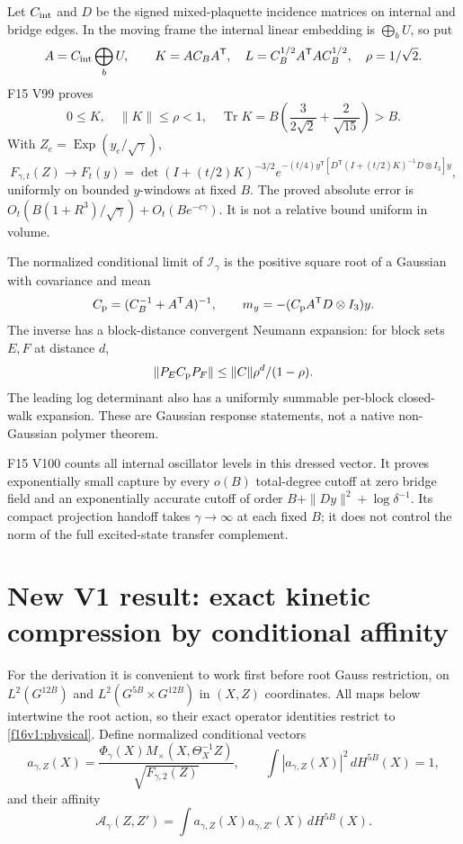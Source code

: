 \documentclass[11pt,oneside]{article}
\DeclareMathOperator{\Tr}{Tr}
\begin{document}
Let \(C_{\rm int}\) and \(D\) be the signed mixed-plaquette incidence
matrices on internal and bridge edges. In the moving frame the
internal linear embedding is \(\bigoplus_bU\), so put
\[
 A=C_{\rm int}\bigoplus_bU,\qquad
 K=AC_BA^{\mathsf T},\quad
 L=C_B^{1/2}A^{\mathsf T}AC_B^{1/2},\quad \rho=1/\sqrt2 .
\]
F15 V99 proves
\[
 0\le K,\quad\|K\|\le\rho<1,\quad
 \Tr K=B\left(\frac3{2\sqrt2}+\frac2{\sqrt{15}}\right)>B.
\]
With \(Z_e=\operatorname{Exp}(y_e/\sqrt\gamma)\),
\begin{equation}
 F_{\gamma,t}(Z)\longrightarrow
 F_t(y)=\det(I+(t/2)K)^{-3/2}
     e^{-(t/4)y^{\mathsf T}
       [D^{\mathsf T}(I+(t/2)K)^{-1}D\otimes I_3]y},
 \label{f16v1:limit}
\end{equation}
uniformly on bounded \(y\)-windows at fixed \(B\).
The proved absolute error is \(O_t(B(1+R^3)/\sqrt\gamma)
+O_t(Be^{-c\gamma})\). It is not a relative bound uniform in volume.

The normalized conditional limit of \(\mathcal I_\gamma\) is the
positive square root of a Gaussian with covariance and mean
\begin{equation}
 C_{\rm p}=(C_B^{-1}+A^{\mathsf T}A)^{-1},\qquad
 m_y=-(C_{\rm p}A^{\mathsf T}D\otimes I_3)y .
 \label{f16v1:posterior}
\end{equation}
The inverse has a block-distance convergent Neumann expansion:
for block sets \(E,F\) at distance \(d\),
\[
 \|P_EC_{\rm p}P_F\|\le\|C\|\rho^d/(1-\rho).
\]
The leading log determinant also has a uniformly summable
per-block closed-walk expansion. These are Gaussian response
statements, not a native non-Gaussian polymer theorem.

F15 V100 counts all internal oscillator levels in this dressed
vector. It proves exponentially small capture by every
\(o(B)\) total-degree cutoff at zero bridge field and an
exponentially accurate cutoff of order
\(B+\|Dy\|^2+\log\delta^{-1}\). Its compact projection handoff
takes \(\gamma\to\infty\) at each fixed \(B\); it does not control
the norm of the full excited-state transfer complement.

\section{New V1 result: exact kinetic compression by conditional affinity}
\label{f16v1:affinity}

For the derivation it is convenient to work first before root Gauss
restriction, on \(L^2(G^{12B})\) and
\(L^2(G^{5B}\times G^{12B})\) in \((X,Z)\) coordinates.
All maps below intertwine the root action, so their exact
operator identities restrict to \eqref{f16v1:physical}.
Define normalized conditional vectors
\begin{equation}
 a_{\gamma,Z}(X)
   =\frac{\Phi_\gamma(X)M_\times(X,\Theta_X^{-1}Z)}
                    {\sqrt{F_{\gamma,2}(Z)}},
 \qquad \int|a_{\gamma,Z}(X)|^2\,dH^{5B}(X)=1,
 \label{f16v1:conditional}
\end{equation}
and their affinity
\[
 \mathcal A_\gamma(Z,Z')
       =\int a_{\gamma,Z}(X)a_{\gamma,Z'}(X)\,dH^{5B}(X).
\]
\end{document}
